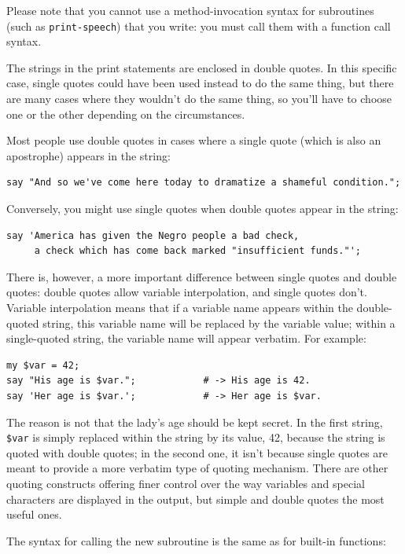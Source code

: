 Please note that you cannot use a method-invocation syntax 
for subroutines (such as \verb"print-speech") that you write: 
you must call them with a function call syntax.

The strings in the print statements are enclosed in double
quotes.  In this specific case, single quotes could have been 
used instead to do the same thing, but there are many cases 
where they wouldn't do the same thing, so you'll have to 
choose one or the other depending on the circumstances.


Most people use double quotes in cases where a single 
quote (which is also an apostrophe) appears in the string:
\begin{verbatim}
say "And so we've come here today to dramatize a shameful condition.";
\end{verbatim}
%
Conversely, you might use single quotes when double quotes 
appear in the string:
\begin{verbatim}
say 'America has given the Negro people a bad check, 
     a check which has come back marked "insufficient funds."';
\end{verbatim}
%
There is, however, a more important difference between single quotes 
and double quotes: double quotes allow variable interpolation, and 
single quotes don't.  Variable interpolation means that if a 
variable name appears within the double-quoted string, this 
variable name will be replaced by the variable value; within a 
single-quoted string, the variable name will appear verbatim. 
For example:
%
\begin{verbatim}
my $var = 42;
say "His age is $var.";            # -> His age is 42.
say 'Her age is $var.';            # -> Her age is $var.
\end{verbatim}
%
The reason is not that the lady's age should be kept secret. 
In the first string, \verb'$var' is simply replaced within the 
string by its value, 42, because the string is quoted with double 
quotes; in the second one, it isn't because single 
quotes are meant to provide a more verbatim type of quoting 
mechanism. There are other quoting constructs offering finer 
control over the way variables and special characters are 
displayed in the output, but simple and double quotes the most 
useful ones.

The syntax for calling the new subroutine is the same as
for built-in functions:

